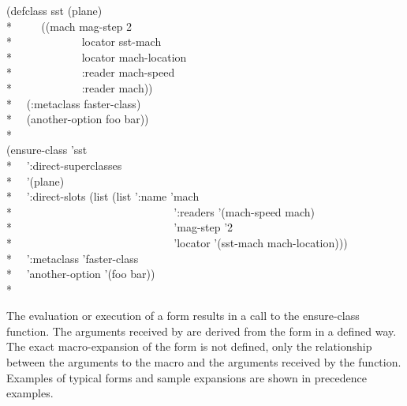 \begin{lisp}
(defclass sst (plane)\\*
~~~~ ((mach mag-step 2\\*
~~~~~~~~~~~~locator sst-mach\\*
~~~~~~~~~~~~locator mach-location\\*
~~~~~~~~~~~~:reader mach-speed\\*
~~~~~~~~~~~~:reader mach))\\*
~~(:metaclass faster-class)\\*
~~(another-option foo bar))\\*
\\
(ensure-class 'sst\\*
~~':direct-superclasses\\*
~~'(plane)\\*
~~':direct-slots (list (list ':name 'mach\\*
~~~~~~~~~~~~~~~~~~~~~~~~~~~~ ':readers '(mach-speed mach)\\*
~~~~~~~~~~~~~~~~~~~~~~~~~~~~ 'mag-step '2\\*
~~~~~~~~~~~~~~~~~~~~~~~~~~~~ 'locator '(sst-mach mach-location)))\\*
~~':metaclass 'faster-class\\*
~~'another-option '(foo bar))\\*
\end{lisp}

The evaluation or execution of a  form results in a call to the
ensure-class function. The arguments received by  are derived from
the  form in a defined way. The exact macro-expansion of the 
form is not defined, only the relationship between the arguments to the 
macro and the arguments received by the  function. Examples of
typical  forms and sample expansions are shown in precedence examples.


